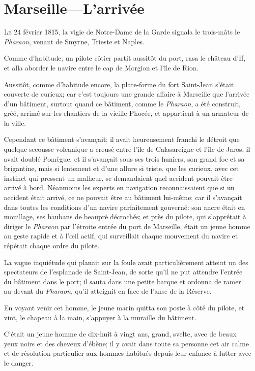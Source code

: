 \chapter{Marseille—L'arrivée}

\lettrine{L}{e} 24 février 1815, la vigie de Notre-Dame de la Garde signala le trois-mâts le \textit{Pharaon}, venant de Smyrne, Trieste et Naples.

\zz
Comme d'habitude, un pilote côtier partit aussitôt du port, rasa le château d'If, et alla aborder le navire entre le cap de Morgion et l'île de Rion.

Aussitôt, comme d'habitude encore, la plate-forme du fort Saint-Jean s'était couverte de curieux; car c'est toujours une grande affaire à Marseille que l'arrivée d'un bâtiment, surtout quand ce bâtiment, comme le \textit{Pharaon}, a été construit, gréé, arrimé sur les chantiers de la vieille Phocée, et appartient à un armateur de la ville.

Cependant ce bâtiment s'avançait; il avait heureusement franchi le détroit que quelque secousse volcanique a creusé entre l'île de Calasareigne et l'île de Jaros; il avait doublé Pomègue, et il s'avançait sous ses trois huniers, son grand foc et sa brigantine, mais si lentement et d'une allure si triste, que les curieux, avec cet instinct qui pressent un malheur, se demandaient quel accident pouvait être arrivé à bord. Néanmoins les experts en navigation reconnaissaient que si un accident était arrivé, ce ne pouvait être au bâtiment lui-même; car il s'avançait dans toutes les conditions d'un navire parfaitement gouverné: son ancre était en mouillage, ses haubans de beaupré décrochés; et près du pilote, qui s'apprêtait à diriger le \textit{Pharaon} par l'étroite entrée du port de Marseille, était un jeune homme au geste rapide et à l'œil actif, qui surveillait chaque mouvement du navire et répétait chaque ordre du pilote.

La vague inquiétude qui planait sur la foule avait particulièrement atteint un des spectateurs de l'esplanade de Saint-Jean, de sorte qu'il ne put attendre l'entrée du bâtiment dans le port; il sauta dans une petite barque et ordonna de ramer au-devant du \textit{Pharaon}, qu'il atteignit en face de l'anse de la Réserve.

En voyant venir cet homme, le jeune marin quitta son poste à côté du pilote, et vint, le chapeau à la main, s'appuyer à la muraille du bâtiment.

C'était un jeune homme de dix-huit à vingt ans, grand, svelte, avec de beaux yeux noirs et des cheveux d'ébène; il y avait dans toute sa personne cet air calme et de résolution particulier aux hommes habitués depuis leur enfance à lutter avec le danger.

